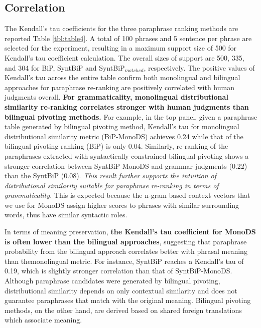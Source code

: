 \documentclass[11pt]{article}
\newcommand{\mnote}[1]{\marginpar{\raggedleft\footnotesize\itshape#1}}
\begin{document}
\subsection{Correlation}
The Kendall's tau coefficients for the three paraphrase ranking methods are reported Table \ref{tbl:table4}. A total of 100 phrases and 5 sentence per phrase are selected for the experiment, resulting in a maximum support size of 500 for Kendall's tau coefficient calculation. The overall sizes of support are 500, 335, and 304 for BiP, SyntBiP and SyntBiP$_{matched}$, respectively. The positive values of Kendall's tau across the entire table confirm both monolingual and bilingual approaches for paraphrase re-ranking are positively correlated with human judgments overall. \textbf{For grammaticality, monolingual distributional similarity re-ranking correlates stronger with human judgments than bilingual pivoting methods.} For example, in the top panel, given a paraphrase table generated by bilingual pivoting method, Kendall's tau for monolingual distributional similarity metric (BiP-MonoDS) achieves 0.24 while that of the bilingual pivoting ranking (BiP) is only 0.04. Similarly, re-ranking of the paraphrases extracted with syntactically-constrained bilingual pivoting shows a stronger correlation between SyntBiP-MonoDS and grammar judgments (0.22) than the SyntBiP (0.08). \mnote{cut this sentence?}\emph{This result further supports the intuition of distributional similarity suitable for paraphrase re-ranking in terms of grammaticality.} This is expected because the %
n-gram based context vectors that we use for MonoDS assign higher scores to phrases with similar surrounding words, thus have similar syntactic roles.

In terms of meaning preservation, \textbf{the Kendall's tau coefficient for MonoDS is often lower than the bilingual approaches}, suggesting that paraphrase probability from the bilingual approach correlates better with phrasal meaning than themonolingual metric. For instance, SyntBiP reaches a Kendall's tau of 0.19, which is slightly stronger correlation than that of SyntBiP-MonoDS. Although paraphrase candidates were generated by bilingual pivoting, distributional similarity depends on only contextual similarity and does not guarantee paraphrases that match with the original meaning. Bilingual pivoting methods, on the other hand, are derived based on %
shared foreign translations which associate meaning. 
\end{document}

